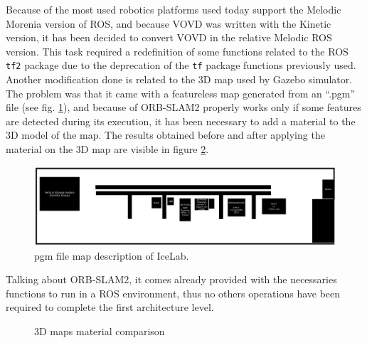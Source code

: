Because of the most used robotics platforms used today support the Melodic Morenia \cite{rosmelodic} version of ROS, and because VOVD was written with the Kinetic version, it has been decided to convert VOVD in the relative Melodic ROS version. This task required a redefinition of some functions related to the ROS \texttt{tf2} package \cite{tfros} due to the deprecation of the \texttt{tf} package functions previously used. 
Another modification done is related to the 3D map used by Gazebo \cite{Gazebo} simulator. The problem was that it came with a featureless map generated from an ``.pgm'' file (see fig. \ref{fig:mapfile}), and because of ORB-SLAM2 properly works only if some features are detected during its execution, it has been necessary to add a material to the 3D model of the map. The results obtained before and after applying the material on the 3D map are visible in figure \ref{fig:3Dmapcomparison}.

\begin{figure}[htbp]
	\centering
	\includegraphics[width=\textwidth]{images/icelabmap}
	\caption{pgm file map description of IceLab.}
	\label{fig:mapfile}
\end{figure}

Talking about ORB-SLAM2, it comes already provided with the necessaries functions to run in a ROS environment, thus no others operations have been required to complete the first architecture level.
	
\begin{figure}[htbp]
	\centering
	\hfil
	\caption{3D maps material comparison}
	\label{fig:3Dmapcomparison}
\end{figure}

